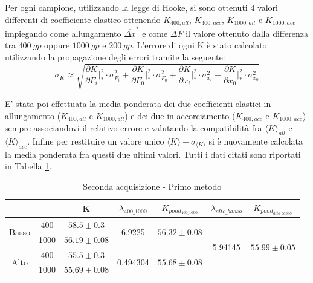 \documentclass[a4paper,11pt,oneside]{article}
\begin{document}
Per ogni campione, utilizzando la legge di Hooke, si sono ottenuti 4 valori differenti di coefficiente elastico ottenendo $K_{400, all}$, $K_{400, acc}$, $K_{1000, all}$ e $K_{1000, acc}$ impiegando come  allungamento ${\overline{\Delta x}}^\ast$ e come $\Delta F$ il valore ottenuto dalla differenza tra $\SI{400}{gp}$ oppure $\SI{1000}{gp} $ e $ \SI{200}{gp}$. L'errore di ogni K è stato calcolato utilizzando la propagazione degli errori tramite la seguente:
\begin{equation*}
\sigma_K \approx \sqrt{ \frac{\partial K }{\partial F_i} \Big|_{\ast}^2 \cdot  \sigma_{ F_i}^2 +
\frac{\partial K }{\partial F_0} \Big|_{\ast}^2\cdot  \sigma_{ F_0}^2 +
 \frac{\partial K }{\partial x_i}\Big|_{\ast}^2 \cdot  \sigma_{x_i}^2 +
 \frac{\partial K }{\partial x_0}\Big|_{\ast}^2\cdot  \sigma_{x_0} ^2 }
\end{equation*}

E' stata poi effettuata la media ponderata dei due coefficienti elastici in allungamento ($K_{400, all}$ e $K_{1000, all}$) e dei due in accorciamento ($K_{400, acc}$ e $K_{1000, acc}$) sempre associandovi il relativo errore e valutando la compatibilità fra ${\langle K \rangle}_{all}$ e ${\langle K \rangle}_{acc}$. Infine per restituire un valore unico $\langle K \rangle \pm \sigma_{\langle K \rangle}$ si è nuovamente calcolata la media ponderata fra questi due ultimi valori. Tutti i dati citati sono riportati in Tabella \ref{tab:2ac_1metodo}.\\%


\begin{table}[h!]
\centering
\label{tab:2ac_1metodo}
    \begin{tabular}{|c|c|c|c|c|c|c|}
        \hline
        \multicolumn{2}{|c|}{}  & K &  $\lambda_{400\_1000}$ & $K_{pond_{400\_1000}}$ & $\lambda_{alto\_basso}$  & $K_{pond_{alto\_basso}}$ \\\hline
        \multirow{2}{*}{Basso} & {\cellcolor[rgb]{0.85,0.85,0.85}}400  & {\cellcolor[rgb]{0.85,0.85,0.85}}$58.5\pm0.3$  & \multirow{2}{*}{6.9225}   & \multirow{2}{*}{$56.32\pm0.08$} & \multirow{4}{*}{5.94145} & \multirow{4}{*}{$55.99\pm0.05$} \\\cline{2-3}
        & 1000 & $56.19\pm0.08$ &  &  &  & \\\cline{1-5}
        \multirow{2}{*}{Alto}  & {\cellcolor[rgb]{0.85,0.85,0.85}}400  & {\cellcolor[rgb]{0.85,0.85,0.85}}$55.5\pm0.3$  & \multirow{2}{*}{0.494304} & \multirow{2}{*}{$55.68\pm0.08$} & & \\\cline{2-3}
        & 1000 & $55.69\pm0.08$ &  &  &  &\\ \hline 
    \end{tabular}
\caption{Seconda acquisizione - Primo metodo}
\end{table}
\end{document}
